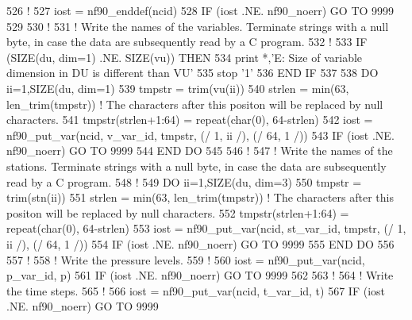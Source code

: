 \begin{DoxyCode}
526     \textcolor{comment}{!}
527     iost    = nf90\_enddef(ncid)
528     \textcolor{keywordflow}{IF} (iost .NE. nf90\_noerr) \textcolor{keywordflow}{GO TO} 9999
529 
530     \textcolor{comment}{!}
531     \textcolor{comment}{! Write the names of the variables. Terminate strings with a null byte, in case the data are
       subsequently read by a C program.}
532     \textcolor{comment}{!}
533     \textcolor{keywordflow}{IF} (\textcolor{keyword}{SIZE}(du, dim=1) .NE. \textcolor{keyword}{SIZE}(vu)) \textcolor{keywordflow}{THEN}
534         print *,\textcolor{stringliteral}{'E: Size of variable dimension in DU is different than VU'}
535         stop \textcolor{stringliteral}{'1'}
536 \textcolor{keywordflow}{    END IF}
537 
538     \textcolor{keywordflow}{DO} ii=1,\textcolor{keyword}{SIZE}(du, dim=1)
539         tmpstr      = trim(vu(ii))
540         strlen      = min(63, len\_trim(tmpstr))           \textcolor{comment}{! The characters after this positon will be
       replaced by null characters.}
541         tmpstr(strlen+1:64)    = repeat(char(0), 64-strlen)
542         iost        = nf90\_put\_var(ncid, v\_var\_id, tmpstr, (/ 1, ii /), (/ 64, 1 /))
543         \textcolor{keywordflow}{IF} (iost .NE. nf90\_noerr) \textcolor{keywordflow}{GO TO} 9999
544 \textcolor{keywordflow}{    END DO}
545 
546     \textcolor{comment}{!}
547     \textcolor{comment}{! Write the names of the stations. Terminate strings with a null byte, in case the data are
       subsequently read by a C program.}
548     \textcolor{comment}{!}
549     \textcolor{keywordflow}{DO} ii=1,\textcolor{keyword}{SIZE}(du, dim=3)
550         tmpstr  = trim(stn(ii))
551         strlen  = min(63, len\_trim(tmpstr))           \textcolor{comment}{! The characters after this positon will be replaced
       by null characters.}
552         tmpstr(strlen+1:64)    = repeat(char(0), 64-strlen)
553         iost    = nf90\_put\_var(ncid, st\_var\_id, tmpstr, (/ 1, ii /), (/ 64, 1 /))
554         \textcolor{keywordflow}{IF} (iost .NE. nf90\_noerr) \textcolor{keywordflow}{GO TO} 9999
555 \textcolor{keywordflow}{    END DO}
556 
557     \textcolor{comment}{!}
558     \textcolor{comment}{! Write the pressure levels.}
559     \textcolor{comment}{!}
560     iost    = nf90\_put\_var(ncid, p\_var\_id, p)
561     \textcolor{keywordflow}{IF} (iost .NE. nf90\_noerr) \textcolor{keywordflow}{GO TO} 9999
562 
563     \textcolor{comment}{!}
564     \textcolor{comment}{! Write the time steps.}
565     \textcolor{comment}{!}
566     iost    = nf90\_put\_var(ncid, t\_var\_id, t)
567     \textcolor{keywordflow}{IF} (iost .NE. nf90\_noerr) \textcolor{keywordflow}{GO TO} 9999

\end{DoxyCode}
